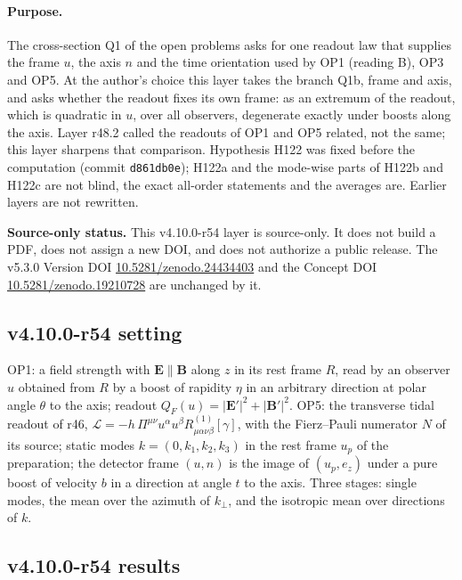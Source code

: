 \paragraph{Purpose.}
The cross-section Q1 of the open problems asks for one readout law that supplies the frame \(u\), the axis \(n\) and the time orientation used by
OP1 (reading B), OP3 and OP5.  At the author's choice this layer takes the branch Q1b, frame and axis, and asks whether the readout fixes its own
frame: as an extremum of the readout, which is quadratic in \(u\), over all observers, degenerate exactly under boosts along the axis.  Layer r48.2
called the readouts of OP1 and OP5 related, not the same; this layer sharpens that comparison.  Hypothesis H122 was fixed before the computation
(commit \texttt{d861db0e}); H122a and the mode-wise parts of H122b and H122c are not blind, the exact all-order statements and the averages are.
Earlier layers are not rewritten.

\noindent\textbf{Source-only status.}
This v4.10.0-r54 layer is source-only.  It does not build a PDF, does not assign a new DOI,
and does not authorize a public release.  The v5.3.0 Version DOI
\href{https://doi.org/10.5281/zenodo.24434403}{10.5281/zenodo.24434403} and the Concept DOI
\href{https://doi.org/10.5281/zenodo.19210728}{10.5281/zenodo.19210728} are unchanged by it.

\subsection*{v4.10.0-r54 setting}
\label{subsec:v4100-r54-setting}

OP1: a field strength with \(\mathbf E\parallel\mathbf B\) along \(z\) in its rest frame \(R\), read by an observer \(u\) obtained from \(R\) by a boost of rapidity \(\eta\) in an arbitrary
direction at polar angle \(\theta\) to the axis; readout \(Q_F(u)=|\mathbf E'|^2+|\mathbf B'|^2\).  OP5: the transverse tidal readout of r46,
\(\mathcal L=-h\,\Pi^{\mu\nu}u^\alpha u^\beta R^{(1)}_{\mu\alpha\nu\beta}[\gamma]\), with the Fierz--Pauli numerator \(N\) of its source; static modes \(k=(0,k_1,k_2,k_3)\) in the rest
frame \(u_p\) of the preparation; the detector frame \((u,n)\) is the image of \((u_p,e_z)\) under a pure boost of velocity \(b\) in a direction at angle \(t\) to the axis.
Three stages: single modes, the mean over the azimuth of \(k_\perp\), and the isotropic mean over directions of \(k\).

\subsection*{v4.10.0-r54 results}
\label{subsec:v4100-r54-results}

